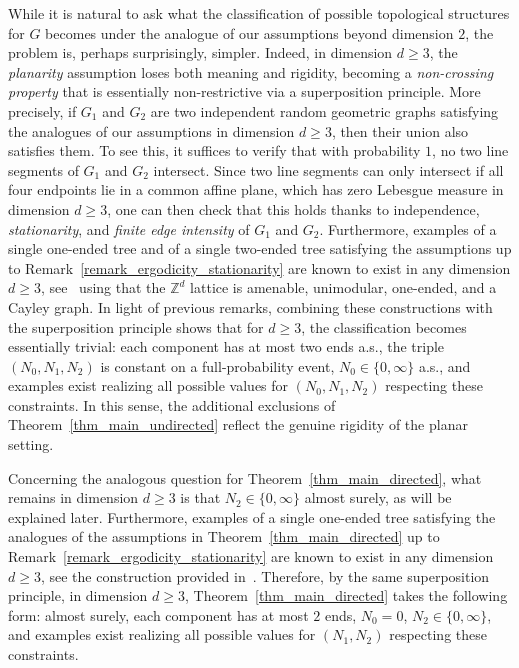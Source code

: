 \documentclass[a4paper, 11pt]{article} %
\theoremstyle{plain}
\newcommand{\Z}{\mathbb{Z}}
\newcommand{\1}{\mathds 1}
\numberwithin{equation}{section}
\begin{document}
While it is natural to ask what the classification of possible topological structures for $G$ becomes under the analogue of our assumptions beyond dimension $2$, the problem is, perhaps surprisingly, simpler. Indeed, in dimension $d\geq 3$, the \emph{planarity} assumption loses both meaning and rigidity, becoming a \emph{non-crossing property} that is essentially non-restrictive via a superposition principle. More precisely, if $G_1$ and $G_2$ are two independent random geometric graphs satisfying the analogues of our assumptions in dimension $d\geq3$, then their union also satisfies them. To see this, it suffices to verify that with probability $1$, no two line segments of $G_1$ and $G_2$ intersect. Since two line segments can only intersect if all four endpoints lie in a common affine plane, which has zero Lebesgue measure in dimension $d\geq3$, one can then check that this holds thanks to independence, \emph{stationarity}, and \emph{finite edge intensity} of $G_1$ and $G_2$. Furthermore, examples of a single one-ended tree and of a single two-ended tree satisfying the assumptions up to Remark~\ref{remark_ergodicity_stationarity} are known to exist in any dimension $d\geq3$, see~\cite{existence_single_one_ended, existence_single_two_ended} using that the $\Z^d$ lattice is amenable, unimodular, one-ended, and a Cayley graph. In light of previous remarks, combining these constructions with the superposition principle shows that for $d\geq3$, the classification becomes essentially trivial: each component has at most two ends a.s., the triple $(N_0,N_1,N_2)$ is constant on a full-probability event, $N_0\in\{0,\infty\}$ a.s., and examples exist realizing all possible values for $(N_0, N_1, N_2)$ respecting these constraints. In this sense, the additional exclusions of Theorem~\ref{thm_main_undirected} reflect the genuine rigidity of the planar setting.

Concerning the analogous question for Theorem~\ref{thm_main_directed}, what remains in dimension $d\geq3$ is that $N_2\in\{0,\infty\}$ almost surely, as will be explained later. Furthermore, examples of a single one-ended tree satisfying the analogues of the assumptions in Theorem~\ref{thm_main_directed} up to Remark~\ref{remark_ergodicity_stationarity} are known to exist in any dimension $d\geq3$, see the construction provided in~\cite{nearest_neighbor_graphs}. Therefore, by the same superposition principle, in dimension $d\geq3$, Theorem~\ref{thm_main_directed} takes the following form: almost surely, each component has at most $2$ ends, $N_0=0$, $N_2\in\{0,\infty\}$, and examples exist realizing all possible values for $(N_1, N_2)$ respecting these constraints.
\end{document}
